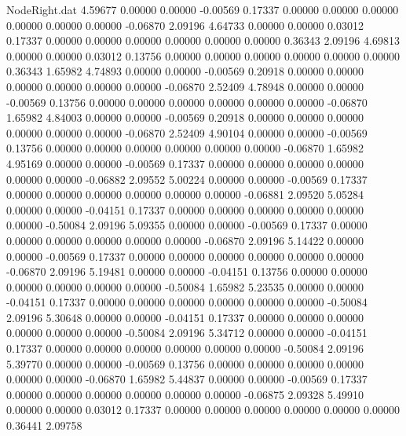 \begin{filecontents}{NodeRight.dat}
   4.59677    0.00000    0.00000    -0.00569    0.17337    0.00000    0.00000    0.00000    0.00000    0.00000    0.00000   -0.06870    2.09196
   4.64733    0.00000    0.00000     0.03012    0.17337    0.00000    0.00000    0.00000    0.00000    0.00000    0.00000    0.36343    2.09196
   4.69813    0.00000    0.00000     0.03012    0.13756    0.00000    0.00000    0.00000    0.00000    0.00000    0.00000    0.36343    1.65982
   4.74893    0.00000    0.00000    -0.00569    0.20918    0.00000    0.00000    0.00000    0.00000    0.00000    0.00000   -0.06870    2.52409
   4.78948    0.00000    0.00000    -0.00569    0.13756    0.00000    0.00000    0.00000    0.00000    0.00000    0.00000   -0.06870    1.65982
   4.84003    0.00000    0.00000    -0.00569    0.20918    0.00000    0.00000    0.00000    0.00000    0.00000    0.00000   -0.06870    2.52409
   4.90104    0.00000    0.00000    -0.00569    0.13756    0.00000    0.00000    0.00000    0.00000    0.00000    0.00000   -0.06870    1.65982
   4.95169    0.00000    0.00000    -0.00569    0.17337    0.00000    0.00000    0.00000    0.00000    0.00000    0.00000   -0.06882    2.09552
   5.00224    0.00000    0.00000    -0.00569    0.17337    0.00000    0.00000    0.00000    0.00000    0.00000    0.00000   -0.06881    2.09520
   5.05284    0.00000    0.00000    -0.04151    0.17337    0.00000    0.00000    0.00000    0.00000    0.00000    0.00000   -0.50084    2.09196
   5.09355    0.00000    0.00000    -0.00569    0.17337    0.00000    0.00000    0.00000    0.00000    0.00000    0.00000   -0.06870    2.09196
   5.14422    0.00000    0.00000    -0.00569    0.17337    0.00000    0.00000    0.00000    0.00000    0.00000    0.00000   -0.06870    2.09196
   5.19481    0.00000    0.00000    -0.04151    0.13756    0.00000    0.00000    0.00000    0.00000    0.00000    0.00000   -0.50084    1.65982
   5.23535    0.00000    0.00000    -0.04151    0.17337    0.00000    0.00000    0.00000    0.00000    0.00000    0.00000   -0.50084    2.09196
   5.30648    0.00000    0.00000    -0.04151    0.17337    0.00000    0.00000    0.00000    0.00000    0.00000    0.00000   -0.50084    2.09196
   5.34712    0.00000    0.00000    -0.04151    0.17337    0.00000    0.00000    0.00000    0.00000    0.00000    0.00000   -0.50084    2.09196
   5.39770    0.00000    0.00000    -0.00569    0.13756    0.00000    0.00000    0.00000    0.00000    0.00000    0.00000   -0.06870    1.65982
   5.44837    0.00000    0.00000    -0.00569    0.17337    0.00000    0.00000    0.00000    0.00000    0.00000    0.00000   -0.06875    2.09328
   5.49910    0.00000    0.00000     0.03012    0.17337    0.00000    0.00000    0.00000    0.00000    0.00000    0.00000    0.36441    2.09758

\end{filecontents}
